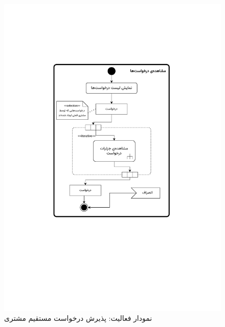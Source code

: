 \begin{figure}[ht!]
	\centering
	\includegraphics[scale=0.8, page=4]{figs/OOD-activity11-20.pdf}
	\caption{نمودار فعالیت: پذیرش درخواست مستقیم مشتری}
\end{figure}
\FloatBarrier
\newpage

